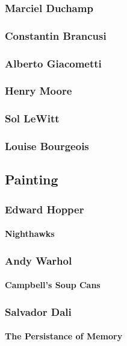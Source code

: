 			\subsubsection{Marciel Duchamp}
			\subsubsection{Constantin Brancusi}
			\subsubsection{Alberto Giacometti}
			\subsubsection{Henry Moore}
			\subsubsection{Sol LeWitt}
			\subsubsection{Louise Bourgeois}
			
		\subsection{Painting}

			\subsubsection{Edward Hopper}
				\paragraph{Nighthawks}
			\subsubsection{Andy Warhol}
				\paragraph{Campbell's Soup Cans}
				
			\subsubsection{Salvador Dali}
				\paragraph{The Persistance of Memory} 
